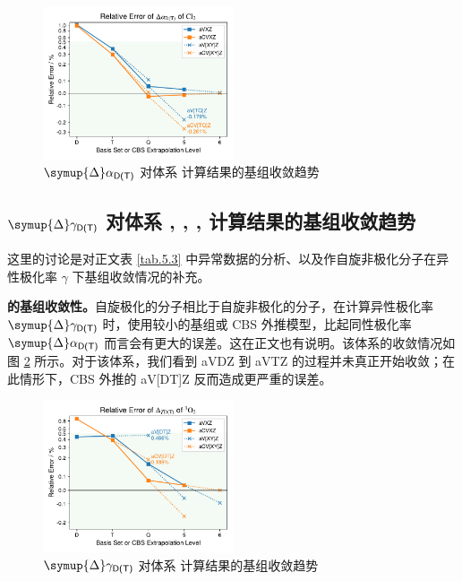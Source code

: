 \begin{figure}[!ht]
    \centering
    \includegraphics[width=0.5\textwidth]{assets/Cl2-iso.pdf}
    \caption{$\symup{\Delta} \alpha_\textsf{D(T)}$ 对体系  计算结果的基组收敛趋势}
    \label{fig.Cl2-iso}
\end{figure}

\subsection{$\symup{\Delta} \gamma_\textsf{D(T)}$ 对体系 , , ,  计算结果的基组收敛趋势}
\label{sec.5.s5}

这里的讨论是对正文表 \ref{tab.5.3} 中异常数据的分析、以及作自旋非极化分子在异性极化率 $\gamma$ 下基组收敛情况的补充。

\textbf{ 的基组收敛性。}自旋极化的分子相比于自旋非极化的分子，在计算异性极化率 $\symup{\Delta} \gamma_\textsf{D(T)}$ 时，使用较小的基组或 CBS 外推模型，比起同性极化率 $\symup{\Delta} \alpha_\textsf{D(T)}$ 而言会有更大的误差。这在正文也有说明。该体系的收敛情况如图 \ref{fig.O2-aniso} 所示。对于该体系，我们看到 aVDZ 到 aVTZ 的过程并未真正开始收敛；在此情形下，CBS 外推的 aV[DT]Z 反而造成更严重的误差。

\begin{figure}[ht]
    \centering
    \includegraphics[width=0.5\textwidth]{assets/O2-aniso.pdf}
    \caption{$\symup{\Delta} \gamma_\textsf{D(T)}$ 对体系  计算结果的基组收敛趋势}
    \label{fig.O2-aniso}
\end{figure}

